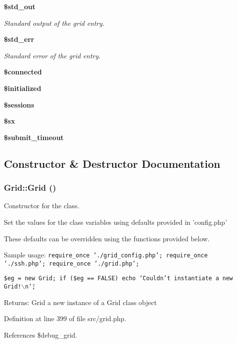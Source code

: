 \begin{CompactItemize}
{\bf \$std\_\-out}
\begin{CompactList}\small\item\em Standard output of the grid entry. \item\end{CompactList}\item 
{\bf \$std\_\-err}
\begin{CompactList}\small\item\em Standard error of the grid entry. \item\end{CompactList}\item 
{\bf \$connected}
\item 
{\bf \$initialized}
\item 
{\bf \$sessions}
\item 
{\bf \$sx}
\item 
{\bf \$submit\_\-timeout}
\end{CompactItemize}


\subsection{Constructor \& Destructor Documentation}
\subsubsection{\setlength{\rightskip}{0pt plus 5cm}Grid::Grid ()}\label{classGrid_a0}


Constructor for the class. 

Set the values for the class variables using defaults provided in 'config.php'

These defaults can be overridden using the functions provided below.

Sample usage: {\tt  require\_\-once './grid\_\-config.php'; require\_\-once './ssh.php'; require\_\-once './grid.php';}

{\tt  \$eg = new Grid; if (\$eg == FALSE) echo \char`\"{}Couldn't instantiate a new Grid!$\backslash$n\char`\"{}; }

\begin{Desc}
\item[Returns:]Grid a new instance of a Grid class object \end{Desc}


Definition at line 399 of file src/grid.php.

References \$debug\_\-grid.
